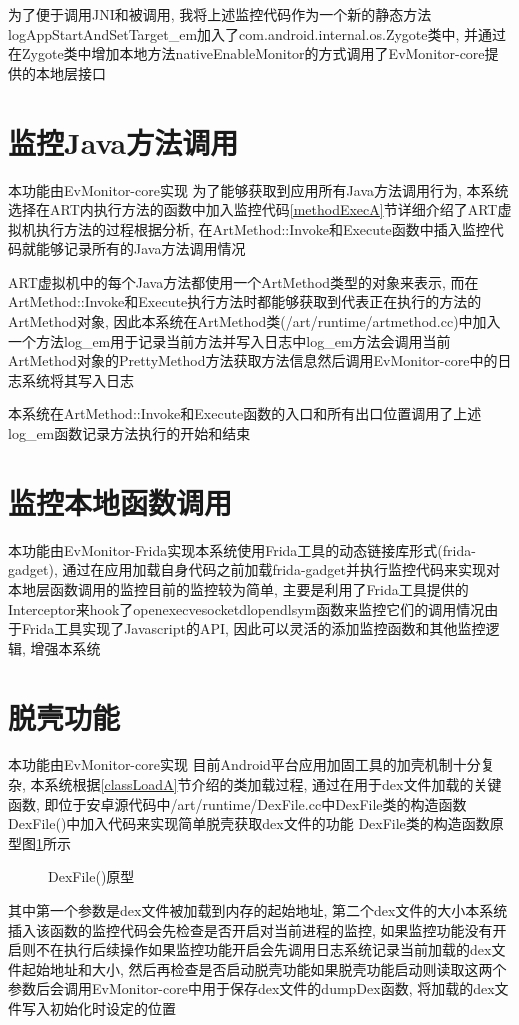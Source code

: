 为了便于调用JNI和被调用, 我将上述监控代码作为一个新的静态方法logAppStartAndSetTarget\_em加入了com.android.internal.os.Zygote类中, 并通过在Zygote类中增加本地方法nativeEnableMonitor的方式调用了EvMonitor-core提供的本地层接口\juhao 

\section{监控Java方法调用}
本功能由EvMonitor-core实现\juhao 
为了能够获取到应用所有Java方法调用行为, 本系统选择在ART内执行方法的函数中加入监控代码\juhao  \ref{methodExecA}节详细介绍了ART虚拟机执行方法的过程\juhao 根据分析, 在ArtMethod::Invoke和Execute函数中插入监控代码就能够记录所有的Java方法调用情况\juhao  

ART虚拟机中的每个Java方法都使用一个ArtMethod类型的对象来表示, 而在ArtMethod::Invoke和Execute执行方法时都能够获取到代表正在执行的方法的ArtMethod对象, 因此本系统在ArtMethod类(/art/runtime/artmethod.cc)中加入一个方法log\_em用于记录当前方法并写入日志中\juhao log\_em方法会调用当前ArtMethod对象的PrettyMethod方法获取方法信息然后调用EvMonitor-core中的日志系统将其写入日志\juhao 

本系统在ArtMethod::Invoke和Execute函数的入口和所有出口位置调用了上述log\_em函数记录方法执行的开始和结束\juhao 

\section{监控本地函数调用}
本功能由EvMonitor-Frida实现\juhao 本系统使用Frida工具的动态链接库形式(frida-gadget), 通过在应用加载自身代码之前加载frida-gadget并执行监控代码来实现对本地层函数调用的监控\juhao 目前的监控较为简单, 主要是利用了Frida工具提供的Interceptor来hook了open\dunhao execve\dunhao socket\dunhao dlopen\dunhao dlsym函数来监控它们的调用情况\juhao 由于Frida工具实现了Javascript的API, 因此可以灵活的添加监控函数和其他监控逻辑, 增强本系统\juhao 


\section{脱壳功能}
本功能由EvMonitor-core实现\juhao 
目前Android平台应用加固工具的加壳机制十分复杂, 本系统根据\ref{classLoadA}节介绍的类加载过程, 通过在用于dex文件加载的关键函数, 即位于安卓源代码中/art/runtime/DexFile.cc中DexFile类的构造函数DexFile()中加入代码来实现简单脱壳获取dex文件的功能\juhao 
DexFile类的构造函数原型图\ref{dexFileCode}所示\juhao 
\begin{figure}[ht]
	\centering
	\caption{DexFile()原型}
	\label{dexFileCode}
\end{figure}
其中第一个参数是dex文件被加载到内存的起始地址, 第二个dex文件的大小\juhao 本系统插入该函数的监控代码会先检查是否开启对当前进程的监控, 如果监控功能没有开启则不在执行后续操作\juhao 如果监控功能开启会先调用日志系统记录当前加载的dex文件起始地址和大小, 然后再检查是否启动脱壳功能\juhao 如果脱壳功能启动则读取这两个参数后会调用EvMonitor-core中用于保存dex文件的dumpDex函数, 将加载的dex文件写入初始化时设定的位置\juhao 


